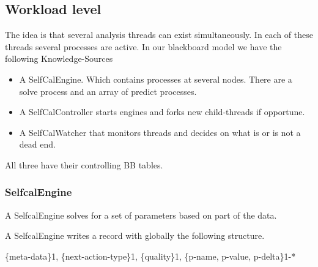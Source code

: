 \documentclass[]{lofar}
\begin{document}
\subsection{Workload level}
\label{id2721606}\hypertarget{id2721606}{}%



    The idea is that several analysis threads can exist
    simultaneously. In each of these threads several processes are
    active. In our blackboard model we have the following
    Knowledge-Sources

    \begin{itemize}

	\item 


       A SelfCalEngine. Which contains processes at several
       nodes. There are a solve process and an array of predict
       processes.

      


	\item 


       A SelfCalController starts engines and forks new child-threads
       if opportune.

      


	\item 


       A SelfCalWatcher that monitors threads and decides on what is or
       is not a dead end.

      

\end{itemize}



    All three have their controlling BB tables.

    
\subsubsection{SelfcalEngine}
\label{id2721640}\hypertarget{id2721640}{}%



      A SelfcalEngine solves for a set of parameters based on part of the data.

     



      A SelfcalEngine writes a record with globally the following
      structure.

     



      \{meta-data\}1, \{next-action-type\}1, \{quality\}1, \{p-name, p-value, p-delta\}1-*
\end{document}

